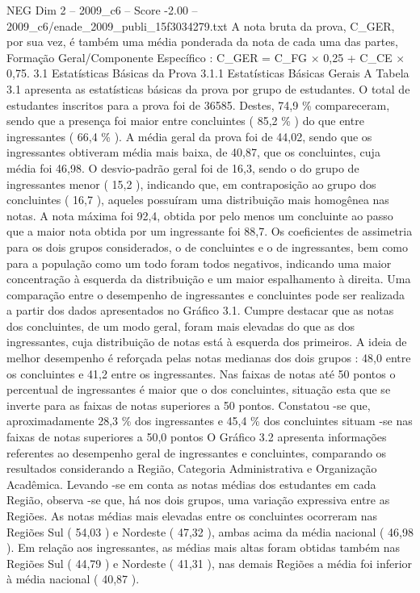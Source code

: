\begin{textsample}{NEG Dim 2 – 2009\_c6 – Score -2.00 – 2009\_c6/enade\_2009\_publi\_15f3034279.txt}
A nota bruta da prova, C\_GER, por sua vez, é também uma média ponderada da nota de cada uma das partes, Formação Geral/Componente Específico : C\_GER = C\_FG × 0,25 + C\_CE × 0,75. 3.1 Estatísticas Básicas da Prova 3.1.1 Estatísticas Básicas Gerais A Tabela 3.1 apresenta as estatísticas básicas da prova por grupo de estudantes.
O total de estudantes inscritos para a prova foi de 36585.
Destes, 74,9 \% compareceram, sendo que a presença foi maior entre concluintes ( 85,2 \% ) do que entre ingressantes ( 66,4 \% ).
A média geral da prova foi de 44,02, sendo que os ingressantes obtiveram média mais baixa, de 40,87, que os concluintes, cuja média foi 46,98.
O desvio-padrão geral foi de 16,3, sendo o do grupo de ingressantes menor ( 15,2 ), indicando que, em contraposição ao grupo dos concluintes ( 16,7 ), aqueles possuíram uma distribuição mais homogênea nas notas.
A nota máxima foi 92,4, obtida por pelo menos um concluinte ao passo que a maior nota obtida por um ingressante foi 88,7.
Os coeficientes de assimetria para os dois grupos considerados, o de concluintes e o de ingressantes, bem como para a população como um todo foram todos negativos, indicando uma maior concentração à esquerda da distribuição e um maior espalhamento à direita.
Uma comparação entre o desempenho de ingressantes e concluintes pode ser realizada a partir dos dados apresentados no Gráfico 3.1.
Cumpre destacar que as notas dos concluintes, de um modo geral, foram mais elevadas do que as dos ingressantes, cuja distribuição de notas está à esquerda dos primeiros.
A ideia de melhor desempenho é reforçada pelas notas medianas dos dois grupos : 48,0 entre os concluintes e 41,2 entre os ingressantes.
Nas faixas de notas até 50 pontos o percentual de ingressantes é maior que o dos concluintes, situação esta que se inverte para as faixas de notas superiores a 50 pontos.
Constatou -se que, aproximadamente 28,3 \% dos ingressantes e 45,4 \% dos concluintes situam -se nas faixas de notas superiores a 50,0 pontos O Gráfico 3.2 apresenta informações referentes ao desempenho geral de ingressantes e concluintes, comparando os resultados considerando a Região, Categoria Administrativa e Organização Acadêmica.
Levando -se em conta as notas médias dos estudantes em cada Região, observa -se que, há nos dois grupos, uma variação expressiva entre as Regiões.
As notas médias mais elevadas entre os concluintes ocorreram nas Regiões Sul ( 54,03 ) e Nordeste ( 47,32 ), ambas acima da média nacional ( 46,98 ).
Em relação aos ingressantes, as médias mais altas foram obtidas também nas Regiões Sul ( 44,79 ) e Nordeste ( 41,31 ), nas demais Regiões a média foi inferior à média nacional ( 40,87 ).

\end{textsample}
